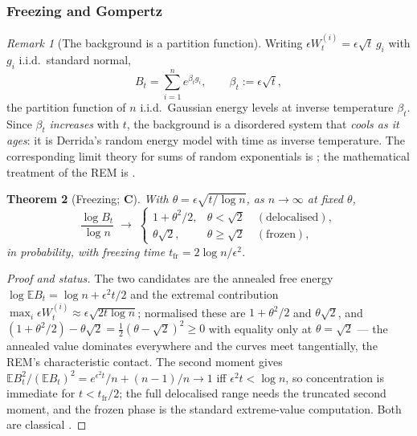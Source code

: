 \documentclass[11pt]{article}
\numberwithin{equation}{section}
\theoremstyle{plain}
\newtheorem{theorem}{Theorem}[section]
\theoremstyle{definition}
\theoremstyle{remark}
\newtheorem{remark}[theorem]{Remark}
\newcommand{\E}{\mathbb{E}}
\begin{document}
\subsubsection{Freezing and Gompertz}\label{tc:subsub:freezing}

\begin{remark}[The background is a partition function]
\label{tc:rem:partition}
Writing $\epsilon W^{(i)}_t=\epsilon\sqrt t\,g_i$ with $g_i$ i.i.d.\
standard normal,
\[
B_t=\sum_{i=1}^{n}e^{\beta_t g_i},\qquad \beta_t:=\epsilon\sqrt t,
\]
the partition function of $n$ i.i.d.\ Gaussian energy levels at inverse
temperature $\beta_t$. Since $\beta_t$ \emph{increases} with $t$, the
background is a disordered system that \emph{cools as it ages}: it is
Derrida's random energy model \cite{Der81,Der80} with time as inverse
temperature. The corresponding limit theory for sums of random
exponentials is \cite{BBM05}; the mathematical treatment of the REM is
\cite{Bov06}.
\end{remark}

\begin{theorem}[Freezing; \textbf{C}]\label{tc:thm:freezing}
With $\theta=\epsilon\sqrt{t/\log n}$, as $n\to\infty$ at fixed
$\theta$,
\begin{equation}\label{tc:eq:freezing}
\frac{\log B_t}{\log n}\;\longrightarrow\;
\begin{cases}
1+\theta^{2}/2, & \theta<\sqrt2\quad(\text{delocalised}),\\
\theta\sqrt2, & \theta\ge\sqrt2\quad(\text{frozen}),
\end{cases}
\end{equation}
in probability, with freezing time
$t_{\mathrm{fr}}=2\log n/\epsilon^{2}$.
\end{theorem}

\begin{proof}[Proof and status]
The two candidates are the annealed free energy
$\log\E B_t=\log n+\epsilon^{2}t/2$ and the extremal contribution
$\max_i\epsilon W^{(i)}_t\approx\epsilon\sqrt{2t\log n}$; normalised
these are $1+\theta^{2}/2$ and $\theta\sqrt2$, and
$(1+\theta^{2}/2)-\theta\sqrt2=\tfrac12(\theta-\sqrt2)^{2}\ge0$ with
equality only at $\theta=\sqrt2$ --- the annealed value dominates
everywhere and the curves meet tangentially, the REM's characteristic
contact. The second moment gives
$\E B_t^{2}/(\E B_t)^{2}=e^{\epsilon^{2}t}/n+(n-1)/n\to1$ iff
$\epsilon^{2}t<\log n$, so concentration is immediate for
$t<t_{\mathrm{fr}}/2$; the full delocalised range needs the truncated
second moment, and the frozen phase is the standard extreme-value
computation. Both are classical \cite{Der81,Bov06,BBM05}.
\end{proof}
\end{document}
